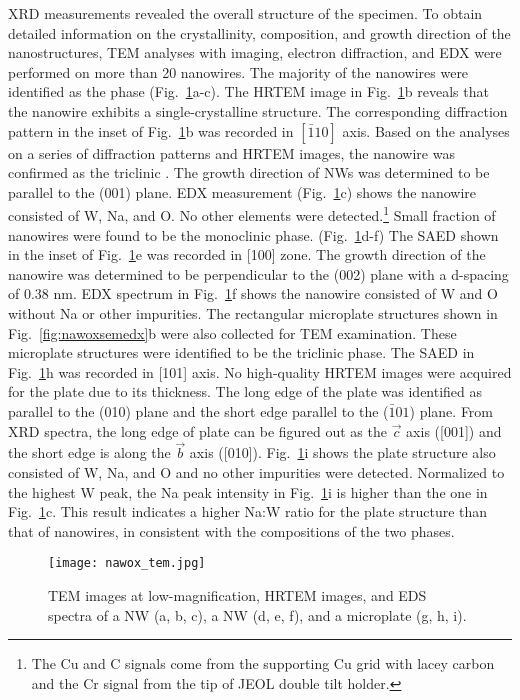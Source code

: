 XRD measurements revealed the overall structure of the specimen. To obtain detailed information on the crystallinity, composition, and growth direction of the nanostructures, TEM analyses with imaging, electron diffraction, and EDX were performed on more than 20 nanowires. The majority of the nanowires were identified as the  phase (Fig.~\ref{fig:nawoxtem}a-c). The HRTEM image in Fig.~\ref{fig:nawoxtem}b reveals that the nanowire exhibits a single-crystalline structure. The corresponding diffraction pattern in the inset of Fig.~\ref{fig:nawoxtem}b was recorded in $[\bar{1}10]$ axis. Based on the analyses on a series of diffraction patterns and HRTEM images, the nanowire was confirmed as the triclinic . The growth direction of  NWs was determined to be parallel to the (001) plane. EDX measurement (Fig.~\ref{fig:nawoxtem}c) shows the nanowire consisted of W, Na, and O. No other elements were detected.\footnote{The Cu and C signals come from the supporting Cu grid with lacey carbon and the Cr signal from the tip of JEOL double tilt holder.} Small fraction of nanowires were found to be the monoclinic  phase. (Fig.~\ref{fig:nawoxtem}d-f) The SAED shown in the inset of Fig.~\ref{fig:nawoxtem}e was recorded in [100] zone. The growth direction of the  nanowire was determined to be perpendicular to the (002) plane with a d-spacing of 0.38 nm. EDX spectrum in Fig.~\ref{fig:nawoxtem}f shows the nanowire consisted of W and O without Na or other impurities. The rectangular microplate structures shown in Fig.~\ref{fig:nawoxsemedx}b were also collected for TEM examination. These microplate structures were identified to be the triclinic  phase. The SAED in Fig.~\ref{fig:nawoxtem}h was recorded in [101] axis. No high-quality HRTEM images were acquired for the  plate due to its thickness. The long edge of the plate was identified as parallel to the (010) plane and the short edge parallel to the ($\bar{1}01$) plane. From XRD spectra, the long edge of  plate can be figured out as the $\vec{c}$ axis ([001]) and the short edge is along the $\vec{b}$ axis ([010]). Fig.~\ref{fig:nawoxtem}i shows the plate structure also consisted of W, Na, and O and no other impurities were detected. Normalized to the highest W peak, the Na peak intensity in Fig.~\ref{fig:nawoxtem}i is higher than the one in Fig.~\ref{fig:nawoxtem}c. This result indicates a higher Na:W ratio for the  plate structure than that of  nanowires, in consistent with the compositions of the two phases.
\begin{figure}[htb]
\centering
\texttt{[image: nawox\_tem.jpg]}
\caption[SEM images of morphology evolution]{TEM images at low-magnification, HRTEM images, and EDS spectra of a  NW (a, b, c), a  NW (d, e, f), and a  microplate (g, h, i). }
\label{fig:nawoxtem}
\end{figure}


